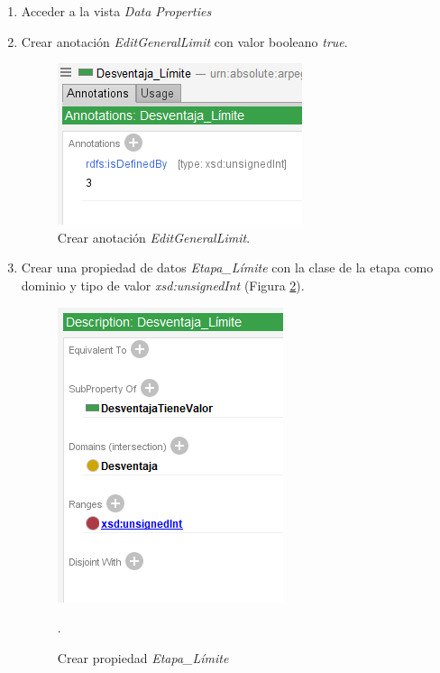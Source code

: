 \begin{enumerate}
    \item Acceder a la vista \textit{Data Properties}
    \item Crear anotación \textit{EditGeneralLimit} con valor booleano \textit{true}.
    \begin{figure}[H]
        \centering
        \includegraphics[scale=0.6]{Figures/Protege/MultipleChoice_3.png}
        \caption{Crear anotación \textit{EditGeneralLimit}.}
        \label{MultipleChoice_3}
    \end{figure}

    \item Crear una propiedad de datos \textit{Etapa\_Límite} con la clase de la etapa como dominio y tipo de valor 
    \textit{xsd:unsignedInt} (Figura \ref*{MultipleChoice_2}).
    \begin{figure}[H]
        \centering
        \includegraphics[scale=0.6]{Figures/Protege/MultipleChoice_2.png}
        \caption{Crear propiedad \textit{Etapa\_Límite}}.
        \label{MultipleChoice_2}
    \end{figure}
    

\end{enumerate}
